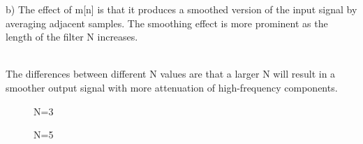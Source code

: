 \documentclass[10pt,a4paper, margin=1in]{article}
\begin{document}
\begin{enumerate}
\begin{enumerate}
        \newpage
        b) The effect of m[n] is that it produces a smoothed version of the input signal by averaging adjacent samples. The smoothing effect is more prominent as the length of the filter N increases.

        \\The differences between different N values are that a larger N will result in a smoother output signal with more attenuation of high-frequency components.
            \begin{figure}[htp] 
                \caption{N=3}
            \end{figure}
            \begin{figure}[htp] 
                \caption{N=5}
            \end{figure}
            \begin{figure}[htp] 

\end{figure}
\end{enumerate}
\end{enumerate}
\end{document}
